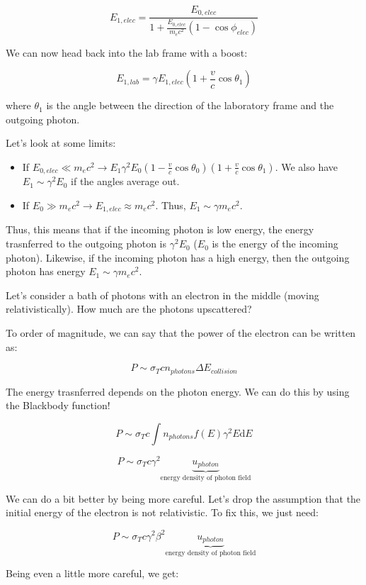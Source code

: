 \documentclass{article}
\begin{document}
$$
E_{1,elec} = \frac{E_{0,elec}}{1 + \frac{E_{0,elec}}{m_e c^2}\left(1 - \cos\phi_{elec}\right)}
$$

We can now head back into the lab frame with a boost:

$$
E_{1,lab} = \gamma E_{1,elec}\left(1 + \frac{v}{c}\cos\theta_1\right)
$$

where $\theta_1$ is the angle between the direction of the laboratory frame and the outgoing photon.

Let's look at some limits:

\begin{itemize}
    \item If $E_{0,elec} \ll m_e c^2 \rightarrow E_1 \gamma^2 E_0\left(1-\frac{v}{c}\cos\theta_0\right)\left(1+\frac{v}{c}\cos\theta_1\right)$. We also have $E_1 \sim \gamma^2 E_0$ if the angles average out. 
    \item If $E_0 \gg m_e c^2 \rightarrow E_{1,elec} \approx m_e c^2$. Thus, $E_1 \sim \gamma m_e c^2$. 
\end{itemize}

Thus, this means that if the incoming photon is low energy, the energy trasnferred to the outgoing photon is $\gamma^2 E_0$ ($E_0$ is the energy of the incoming photon). Likewise, if the incoming photon has a high energy, then the outgoing photon has energy $E_1 \sim \gamma m_e c^2$.

Let's consider a bath of photons with an electron in the middle (moving relativistically). How much are the photons upscattered?

To order of magnitude, we can say that the power of the electron can be written as:

$$
P \sim \sigma_T c n_{photons} \Delta E_{collision}
$$

The energy trasnferred depends on the photon energy. We can do this by using the Blackbody function!

$$
P \sim \sigma_T c \int n_{photons} f(E) \gamma^2 E \mathrm{d}E
$$

$$
P \sim \sigma_T c \gamma^2 \underbrace{u_{photon}}_\text{energy density of photon field}
$$

We can do a bit better by being more careful. Let's drop the assumption that the initial energy of the electron is not relativistic. To fix this, we just need:

$$
P \sim \sigma_T c \gamma^2 \beta^2 \underbrace{u_{photon}}_\text{energy density of photon field}
$$

Being even a little more careful, we get:
\end{document}

